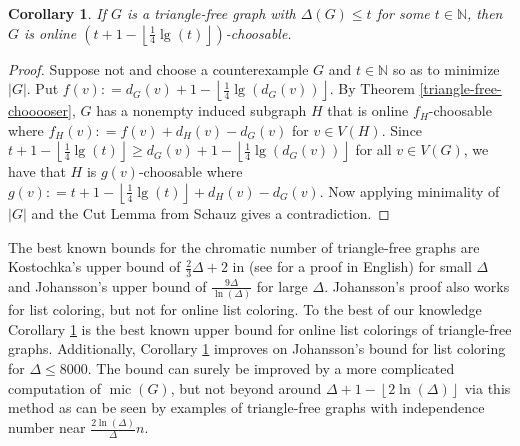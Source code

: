 \documentclass[12pt]{article}
\theoremstyle{plain}
\newtheorem{cor}[thm]{Corollary}
\theoremstyle{definition}
\theoremstyle{remark}
\newcommand{\IN}{\mathbb{N}}
\newcommand{\card}[1]{\left|#1\right|}
\newcommand{\floor}[1]{\left\lfloor#1\right\rfloor}
\newcommand{\parens}[1]{\left( #1 \right)}
\newcommand{\DefinedAs}{\mathrel{\mathop:}=}
\newcommand{\mic}{\operatorname{mic}}
\begin{document}
\begin{cor}\label{tricolor}
	If $G$ is a triangle-free graph with $\Delta(G) \le t$ for some $t \in \IN$, then $G$ is online $\parens{t + 1 - \floor{\frac14 \lg(t)}}$-choosable.
\end{cor}
\begin{proof}
	Suppose not and choose a counterexample $G$ and $t \in \IN$ so as to minimize $\card{G}$.  Put $f(v) \DefinedAs d_G(v) + 1 - \floor{\frac14 \lg(d_G(v))}$.  By Theorem \ref{triangle-free-chooooser}, $G$ has a nonempty induced subgraph $H$ that is online $f_H$-choosable where $f_H(v) \DefinedAs f(v) + d_H(v) - d_G(v)$ for $v \in V(H)$.  Since $t + 1 - \floor{\frac14 \lg(t)} \ge d_G(v) + 1 - \floor{\frac14 \lg(d_G(v))}$ for all $v \in V(G)$, we have that $H$ is $g(v)$-choosable where $g(v) \DefinedAs t + 1 - \floor{\frac14 \lg(t)} + d_H(v) - d_G(v)$.  Now applying minimality of $\card{G}$ and the Cut Lemma from Schauz \cite{schauz2009mr} gives a contradiction.
\end{proof}

The best known bounds for the chromatic number of triangle-free graphs are Kostochka's upper bound of $\frac23 \Delta + 2$ in \cite{KostochkaTriangleFree} (see \cite{rabern2010destroying} for a proof in English) for small $\Delta$ and Johansson's upper bound of $\frac{9\Delta}{\ln(\Delta)}$ for large $\Delta$.  Johansson's proof also works for list coloring, but not for online list coloring.  To the best of our knowledge Corollary \ref{tricolor} is the best known upper bound for online list colorings of triangle-free graphs.  Additionally, Corollary \ref{tricolor} improves on Johansson's bound for list coloring for $\Delta \le 8000$.  The bound can surely be improved by a more complicated computation of $\mic(G)$, but not beyond around $\Delta + 1 - \floor{2\ln(\Delta)}$ via this method as can be seen by examples of triangle-free graphs with independence number near $\frac{2\ln(\Delta)}{\Delta}n$.



\end{document}
